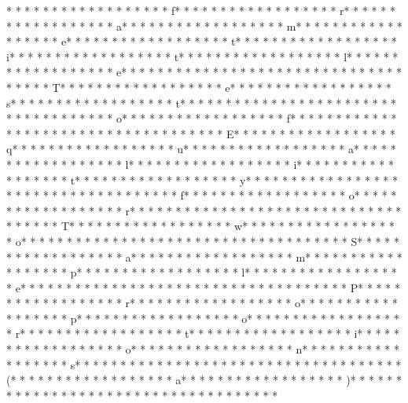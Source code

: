 * * *  * * *  * * *  *  * * *  *  * * *  * f* * *  * * *  * * *  *  * * *  *  * * *  * r* * *  * * *  * * *  *  * * *  *  * * *  * a* * *  * * *  * * *  *  * * *  *  * * *  * m* * *  * * *  * * *  *  * * *  *  * * *  * e* * *  * * *  * * *  *  * * *  *  * * *  * t* * *  * * *  * * *  *  * * *  *  * * *  * i* * *  * * *  * * *  *  * * *  *  * * *  * t* * *  * * *  * * *  *  * * *  *  * * *  * l* * *  * * *  * * *  *  * * *  *  * * *  * e* * *  * * *  * * *  *  * * *  *  * * *  * {* * *  * * *  * * *  *  * * *  *  * * *  * T* * *  * * *  * * *  *  * * *  *  * * *  * e* * *  * * *  * * *  *  * * *  *  * * *  * s* * *  * * *  * * *  *  * * *  *  * * *  * t* * *  * * *  * * *  *  * * *  *  * * *  *  * * *  * * *  * * *  *  * * *  *  * * *  * o* * *  * * *  * * *  *  * * *  *  * * *  * f* * *  * * *  * * *  *  * * *  *  * * *  *  * * *  * * *  * * *  *  * * *  *  * * *  * E* * *  * * *  * * *  *  * * *  *  * * *  * q* * *  * * *  * * *  *  * * *  *  * * *  * u* * *  * * *  * * *  *  * * *  *  * * *  * a* * *  * * *  * * *  *  * * *  *  * * *  * l* * *  * * *  * * *  *  * * *  *  * * *  * i* * *  * * *  * * *  *  * * *  *  * * *  * t* * *  * * *  * * *  *  * * *  *  * * *  * y* * *  * * *  * * *  *  * * *  *  * * *  *  * * *  * * *  * * *  *  * * *  *  * * *  * f* * *  * * *  * * *  *  * * *  *  * * *  * o* * *  * * *  * * *  *  * * *  *  * * *  * r* * *  * * *  * * *  *  * * *  *  * * *  *  * * *  * * *  * * *  *  * * *  *  * * *  * T* * *  * * *  * * *  *  * * *  *  * * *  * w* * *  * * *  * * *  *  * * *  *  * * *  * o* * *  * * *  * * *  *  * * *  *  * * *  *  * * *  * * *  * * *  *  * * *  *  * * *  * S* * *  * * *  * * *  *  * * *  *  * * *  * a* * *  * * *  * * *  *  * * *  *  * * *  * m* * *  * * *  * * *  *  * * *  *  * * *  * p* * *  * * *  * * *  *  * * *  *  * * *  * l* * *  * * *  * * *  *  * * *  *  * * *  * e* * *  * * *  * * *  *  * * *  *  * * *  *  * * *  * * *  * * *  *  * * *  *  * * *  * P* * *  * * *  * * *  *  * * *  *  * * *  * r* * *  * * *  * * *  *  * * *  *  * * *  * o* * *  * * *  * * *  *  * * *  *  * * *  * p* * *  * * *  * * *  *  * * *  *  * * *  * o* * *  * * *  * * *  *  * * *  *  * * *  * r* * *  * * *  * * *  *  * * *  *  * * *  * t* * *  * * *  * * *  *  * * *  *  * * *  * i* * *  * * *  * * *  *  * * *  *  * * *  * o* * *  * * *  * * *  *  * * *  *  * * *  * n* * *  * * *  * * *  *  * * *  *  * * *  * s* * *  * * *  * * *  *  * * *  *  * * *  *  * * *  * * *  * * *  *  * * *  *  * * *  * (* * *  * * *  * * *  *  * * *  *  * * *  * a* * *  * * *  * * *  *  * * *  *  * * *  * )* * *  * * *  * * *  *  * * *  *  * * *  * }* * *  * * *  * * *  *  * * *  *  * * *  * 
